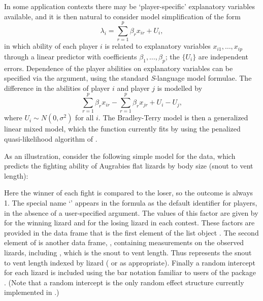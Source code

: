 In some application contexts there may be `player-specific' explanatory
variables available, and it is then natural to consider model simplification of
the form
\begin{equation}
\lambda_i=\sum_{r=1}^p\beta_rx_{ir} + U_i,
\end{equation}
in which ability of each player $i$ is related to explanatory variables
$x_{i1},\ldots,x_{ip}$ through a linear predictor with coefficients
$\beta_1,\ldots,\beta_p$; the $\{U_i\}$ are independent errors.
Dependence of the player abilities on explanatory variables can be specified via the
 argument, using the standard \emph{S}-language
model formulae.  The difference in the abilities of player $i$
and player $j$ is modelled by
\begin{equation}
\sum_{r=1}^p\beta_rx_{ir} - \sum_{r=1}^p\beta_rx_{jr} + U_i - U_j,
\label{eq:structured}
\end{equation}
where $U_i \sim N(0, \sigma^2)$ for all $i$. The Bradley-Terry model is then a
generalized linear mixed model, which the  function currently
fits by using the penalized quasi-likelihood algorithm of \citet{bres:93}.

As an illustration, consider the following simple model for the
 data, which predicts the fighting ability of Augrabies flat
lizards by body size (snout to vent length):

\Rcodeplaceholder{}

Here the winner of each fight is compared to the loser, so the outcome is
always 1.  The special name `' appears in the formula as the default
identifier for players, in the absence of a user-specified  argument.
The values of this factor are given by  for the winning lizard
and  for the losing lizard in each contest. %
These factors are provided in the data frame  that is the
first element of the list object . The second element of
 is another data frame, , containing
measurements on the observed lizards, including , which is the snout
to vent length. Thus  represents the snout to vent length
indexed by lizard ( or  as appropriate).  Finally a
random intercept for each lizard is included using the bar notation familiar
to users of the  package \citep{bate:11}. (Note that a random intercept is the only random effect
structure currently implemented in .)

